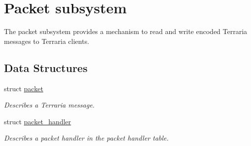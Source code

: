 \hypertarget{group__packet}{}\section{Packet subsystem}
\label{group__packet}


The packet subsystem provides a mechanism to read and write encoded Terraria messages to Terraria clients.  


\subsection*{Data Structures}
\begin{DoxyCompactItemize}
\item 
struct \hyperlink{structpacket}{packet}
\begin{DoxyCompactList}\small\item\em Describes a Terraria message. \end{DoxyCompactList}\item 
struct \hyperlink{structpacket__handler}{packet\+\_\+handler}
\begin{DoxyCompactList}\small\item\em Describes a packet handler in the packet handler table. \end{DoxyCompactList}\end{DoxyCompactItemize}
